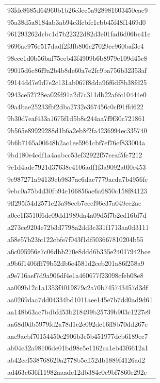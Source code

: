 \begin{tabular}{l}
93fdc8685d64960b1b26c3ec5a928981603450eae9 \\
95a38d5a8184ab3ab94c3fcbfc1cbb45f48f1469d0 \\
961293262dcbc1d7b22322d82d3e01fad6d06bc41c \\
9696ac976e517dadf2f3fb806c27029ee960baf3e4 \\
98cce1d0b56baf75eeb43f4909b6b8979e109d45c8 \\
99015d6c86f9a2b4b8de60a7e2fc9ba756b32353af \\
99144dd7e9d7e2c131ab067f8dda96f6df8b38fd25 \\
9943ce52728ea02fd91a2d7c311db22a6fc10444e0 \\
99a4bae25233fbf2dba2732e367456c0cf91ffd622 \\
9b30d7eaf433a1675f1d5b8c244aa7f9f30c721861 \\
9b565e89929288d1b6a2eb8f2fa4236994ec335740 \\
9b6b7165a00648b2ac1ee5961cbf7ef76cf833004a \\
9bd180e4cdf1a4aabcc53ef32922f57ceaf5fc7212 \\
9c1d4ade7921d37638e4106adf1f3a9092a0f0e453 \\
9e987271a94139cb9837ac6dae7779aeda7b4956fc \\
9ebc0a75b4d30fb94e166856ae6a6850c158f84123 \\
9ff295f54d2571c23a98ecb7cecf96e37a049ee2ae \\
a0cc1f3510f6dc09dd1989da4a09d5f7b2ed16bf7d \\
a273ce9204e72b3d7798a2dd3c331f1713aa0d3111 \\
a58e57b23fc122cbfe7f043f1df503667810204b55 \\
a6c095956e7c06dbb270e8ddd6b335e24017942bce \\
a9b6f1406fff79b52db6e4581d2ceb201a86f258a9 \\
a9e716aef7d9a906df4e1a460677f23098cfeb08e8 \\
aa009b12c1a1353f4019879c2a70b745743457d3df \\
aa0269daa7dd04334bd1011aee145e7b7dd0ad9d61 \\
aa148b63ac7bdbfd53b218499b25739b903c1227e9 \\
aa68d0db5979fd2a78d1e2c092dc16ff8b70dd267e \\
aae9acbf70154450c2906b3e5b451977dcb6189ec7 \\
ab04c32a98106de01bd98e5e1162ca1eb43f6612a1 \\
ab42ccf538768620a2778b5cff52db1889f4126ad2 \\
ad463c636f11982aaade12db384c0c9bf7860e292c \\

\end{tabular}
